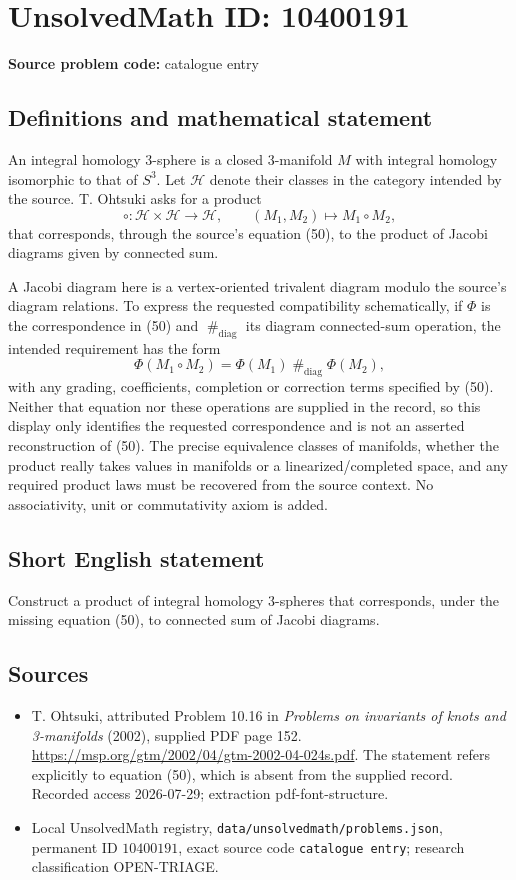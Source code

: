 \documentclass[11pt]{article}
\begin{document}
\section*{UnsolvedMath ID: 10400191}
\textbf{Source problem code:} catalogue entry
\subsection{Definitions and mathematical statement}
An integral homology \(3\)-sphere is a closed \(3\)-manifold \(M\) with integral homology isomorphic to that of \(S^3\). Let \(\mathcal H\) denote their classes in the category intended by the source. T. Ohtsuki asks for a product
\[
 \circ:\mathcal H\times\mathcal H\longrightarrow\mathcal H,
 \qquad(M_1,M_2)\longmapsto M_1\circ M_2,
\]
that corresponds, through the source's equation (50), to the product of Jacobi diagrams given by connected sum.

A Jacobi diagram here is a vertex-oriented trivalent diagram modulo the source's diagram relations. To express the requested compatibility schematically, if \(\Phi\) is the correspondence in (50) and \(\mathbin{\#}_{\mathrm{diag}}\) its diagram connected-sum operation, the intended requirement has the form
\[
 \Phi(M_1\circ M_2)
   =\Phi(M_1)\mathbin{\#}_{\mathrm{diag}}\Phi(M_2),
\]
with any grading, coefficients, completion or correction terms specified by (50). Neither that equation nor these operations are supplied in the record, so this display only identifies the requested correspondence and is not an asserted reconstruction of (50). The precise equivalence classes of manifolds, whether the product really takes values in manifolds or a linearized/completed space, and any required product laws must be recovered from the source context. No associativity, unit or commutativity axiom is added.
\subsection{Short English statement}
Construct a product of integral homology \(3\)-spheres that corresponds, under the missing equation (50), to connected sum of Jacobi diagrams.
\subsection{Sources}
\begin{itemize}
\item T. Ohtsuki, attributed Problem 10.16 in \emph{Problems on invariants of knots and 3-manifolds} (2002), supplied PDF page 152. \url{https://msp.org/gtm/2002/04/gtm-2002-04-024s.pdf}. The statement refers explicitly to equation (50), which is absent from the supplied record. Recorded access 2026-07-29; extraction pdf-font-structure.
\item Local UnsolvedMath registry, \texttt{data/unsolvedmath/problems.json}, permanent ID \(10400191\), exact source code \texttt{catalogue entry}; research classification OPEN-TRIAGE.
\end{itemize}
\end{document}
